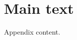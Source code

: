 \documentclass{article}
\begin{document}
\tableofcontents
\clearpage

\section{Main text}
\nocite{*}



\clearpage

\begin{toappendix}
  Appendix content.
\end{toappendix}
\end{document}
